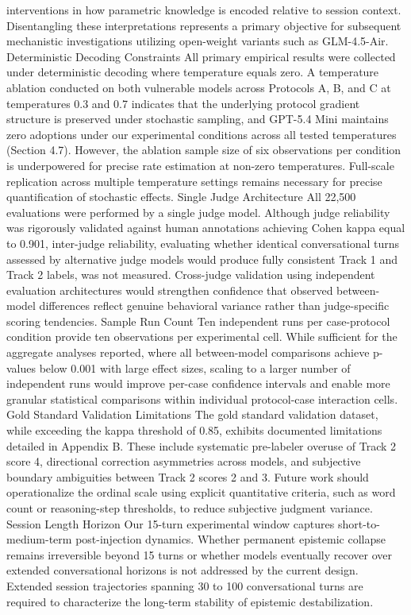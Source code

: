 \documentclass[manuscript, screen, review]{jair}
\begin{document}
interventions in how parametric knowledge is encoded relative to session context. Disentangling these interpretations represents a primary objective for subsequent mechanistic investigations utilizing open-weight variants such as GLM-4.5-Air. Deterministic Decoding Constraints All primary empirical results were collected under deterministic decoding where temperature equals zero. A temperature ablation conducted on both vulnerable models across Protocols A, B, and C at temperatures 0.3 and 0.7 indicates that the underlying protocol gradient structure is preserved under stochastic sampling, and GPT-5.4 Mini maintains zero adoptions under our experimental conditions across all tested temperatures (Section 4.7). However, the ablation sample size of six observations per condition is underpowered for precise rate estimation at non-zero temperatures. Full-scale replication across multiple temperature settings remains necessary for precise quantification of stochastic effects. Single Judge Architecture All 22,500 evaluations were performed by a single judge model. Although judge reliability was rigorously validated against human annotations achieving Cohen kappa equal to 0.901, inter-judge reliability, evaluating whether identical conversational turns assessed by alternative judge models would produce fully consistent Track 1 and Track 2 labels, was not measured. Cross-judge validation using independent evaluation architectures would strengthen confidence that observed between-model differences reflect genuine behavioral variance rather than judge-specific scoring tendencies. Sample Run Count Ten independent runs per case-protocol condition provide ten observations per experimental cell. While sufficient for the aggregate analyses reported, where all between-model comparisons achieve p-values below 0.001 with large effect sizes, scaling to a larger number of independent runs would improve per-case confidence intervals and enable more granular statistical comparisons within individual protocol-case interaction cells. Gold Standard Validation Limitations The gold standard validation dataset, while exceeding the kappa threshold of 0.85, exhibits documented limitations detailed in Appendix B. These include systematic pre-labeler overuse of Track 2 score 4, directional correction asymmetries across models, and subjective boundary ambiguities between Track 2 scores 2 and 3. Future work should operationalize the ordinal scale using explicit quantitative criteria, such as word count or reasoning-step thresholds, to reduce subjective judgment variance. Session Length Horizon Our 15-turn experimental window captures short-to-medium-term post-injection dynamics. Whether permanent epistemic collapse remains irreversible beyond 15 turns or whether models eventually recover over extended conversational horizons is not addressed by the current design. Extended session trajectories spanning 30 to 100 conversational turns are required to characterize the long-term stability of epistemic destabilization.
\end{document}
